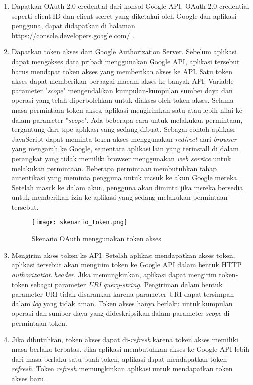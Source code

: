 	\begin{enumerate}
  	\item Dapatkan OAuth 2.0 credential dari konsol Google API. OAuth 2.0 credential seperti client ID dan client secret yang diketahui oleh Google dan aplikasi pengguna, dapat didapatkan di halaman https://console.developers.google.com/ . 
  	\item Dapatkan token akses dari Google Authorization Server. Sebelum aplikasi dapat mengakses data pribadi menggunakan Google API, aplikasi tersebut harus mendapat token akses yang memberikan akses ke API. Satu token akses dapat memberikan berbagai macam akses ke banyak API. Variable parameter "\textit{scope}" mengendalikan kumpulan-kumpulan sumber daya dan operasi yang telah diperbolehkan untuk diakses oleh token akses. Selama masa permintaan token akses, aplikasi mengirimkan satu atau lebih nilai ke dalam parameter "\textit{scope}". Ada beberapa cara untuk melakukan permintaan, tergantung dari tipe aplikasi yang sedang dibuat. Sebagai contoh aplikasi JavaScript dapat meminta token akses menggunakan \textit{redirect} dari \textit{browser} yang mengarah ke Google, sementara aplikasi lain yang terinstall di dalam perangkat yang tidak memiliki browser menggunakan \textit{web service} untuk melakukan permintaan. Beberapa permintaan membutuhkan tahap autentikasi yang meminta pengguna untuk masuk ke akun Google mereka. Setelah masuk ke dalam akun, pengguna akan diminta jika mereka bersedia untuk memberikan izin ke aplikasi yang sedang melakukan permintaan tersebut.
  	\begin{figure} [H]
	\centering  
	\texttt{[image: skenario\_token.png]}  
	\caption[Skenario OAuth menggunakan token akses]{Skenario OAuth menggunakan token akses} 
	\label{fig:skenario-token} 
\end{figure}
  	\item Mengirim akses token ke API. Setelah aplikasi mendapatkan akses token, aplikasi tersebut akan mengirim token ke Google API dalam bentuk HTTP \textit{authorization header}. Jika memungkinkan, aplikasi dapat mengirim token-token sebagai parameter \textit{URI query-string}. Pengiriman dalam bentuk parameter URI tidak disarankan karena parameter URI dapat tersimpan dalam \textit{log} yang tidak aman. Token akses hanya berlaku untuk kumpulan operasi dan sumber daya yang dideskripsikan dalam parameter \textit{scope} di permintaan token. 
	\item Jika dibutuhkan, token akses dapat di-\textit{refresh} karena token akses memiliki masa berlaku terbatas. Jika aplikasi membutuhkan akses ke Google API lebih dari masa berlaku satu buah token, aplikasi dapat mendapatkan token \textit{refresh}. Token \textit{refresh} memungkinkan aplikasi untuk mendapatkan token akses baru.
  
\end{enumerate}

